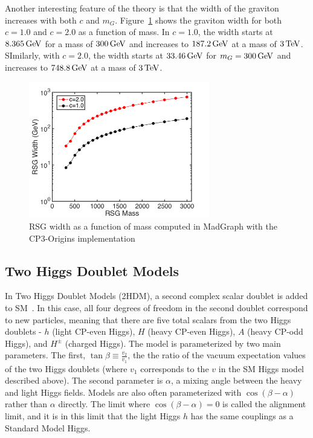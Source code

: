 Another interesting feature of the theory is that the width of the graviton increases with both $c$ and $m_G$. Figure~\ref{fig:G_width} shows the graviton width for both $c=1.0$ and $c=2.0$ as a function of mass. In $c=1.0$, the width starts at $8.365 \GeV$ for a mass of $300 \GeV$ and increases to $187.2 \GeV$ at a mass of $3 \TeV$. SImilarly, with $c=2.0$, the width starts at $33.46 \GeV$ for $m_G = 300 \GeV$ and increases to $748.8 \GeV$ at a mass of $3 \TeV$. 

\begin{figure}[h!]
  \centering
  \captionsetup{justification=centering}

  \includegraphics[width=0.7\textwidth]{figures/RSG_width}
   \caption{RSG width as a function of mass computed in MadGraph with the CP3-Origins implementation~\cite{RSG_LHC,MadGraph,CP3Origins}}
  \label{fig:G_width}
\end{figure}

\subsection{Two Higgs Doublet Models}

In Two Higgs Doublet Models (2HDM), a second complex scalar doublet is added to SM~\cite{HH_2HDM,2HDM2,2HDM3}. In this case, all four degrees of freedom in the second doublet correspond to new particles, meaning that there are five total scalars from the two Higgs doublets - $h$ (light CP-even Higgs), $H$ (heavy CP-even Higgs), $A$ (heavy CP-odd Higgs), and $H^{\pm}$ (charged Higgs). The model is parameterized by two main parameters. The first, $\tan{\beta} \equiv \frac{v_2}{v_1}$, the the ratio of the vacuum expectation values of the two Higgs doublets (where $v_1$ corresponds to the $v$ in the SM Higgs model described above). The second parameter is $\alpha$, a mixing angle between the heavy and light Higgs fields. Models are also often parameterized with $\cos(\beta - \alpha)$ rather than $\alpha$ directly. The limit where $\cos(\beta - \alpha) = 0$ is called the alignment limit, and it is in this limit that the light Higgs $h$ has the same couplings as a Standard Model Higgs. 

